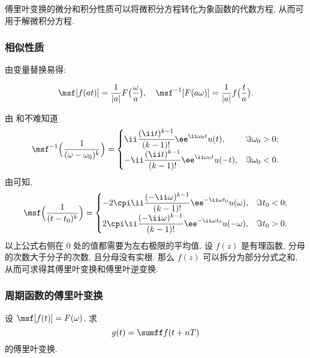 傅里叶变换的微分和积分性质可以将微积分方程转化为象函数的代数方程, 从而可用于解微积分方程.


\subsubsection{相似性质}

由变量替换易得:
\begin{theorem}[相似性质]\label{thm:fourier-similar-property}
  \[
    \msf[f(at)]=\frac1{|a|}F\bigl(\frac\omega a\bigr),\quad
    \msf^{-1}[F(a\omega)]=\frac1{|a|}f\bigl(\frac t a\bigr).
  \]
\end{theorem}

由 和\thmFSim 不难知道
\begin{equation}
  \label{eq:fourier-inverse-transform-rational-function}
  \msf^{-1}\Bigl(\frac1{(\omega-\omega_0)^k}\Bigr)
  =\begin{cases}
    \ii\dfrac{(\ii t)^{k-1}}{(k-1)!}\ee^{\ii \omega_0 t} u(t),
    &\Im\omega_0>0;\\
    -\ii\dfrac{(\ii t)^{k-1}}{(k-1)!}\ee^{\ii \omega_0 t} u(-t),
    &\Im\omega_0<0.
  \end{cases}
\end{equation}
由\thmFSym 可知,
\begin{equation}
  \label{eq:fourier-transform-rational-function}
  \msf\Bigl(\frac1{(t-t_0)^k}\Bigr)
  =\begin{cases}
    -2\cpi\ii\dfrac{(-\ii \omega)^{k-1}}{(k-1)!}\ee^{-\ii \omega t_0} u(\omega),
    &\Im t_0<0;\\
    2\cpi\ii\dfrac{(-\ii \omega)^{k-1}}{(k-1)!}\ee^{-\ii \omega t_0} u(-\omega),
    &\Im t_0>0.
  \end{cases}
\end{equation}
以上公式右侧在 $0$ 处的值都需要为左右极限的平均值.
设 $f(z)$ 是有理函数, 分母的次数大于分子的次数, 且分母没有实根.
那么 $f(z)$ 可以拆分为部分分式之和, 从而可求得其傅里叶变换和傅里叶逆变换.


\subsubsection{周期函数的傅里叶变换}

\begin{example}\label{exam:fourier-transform-period-function}
  设 $\msf[f(t)]=F(\omega)$. 求
  \[
    g(t)=\sumff f(t+nT)
  \]
  的傅里叶变换.
\end{example}


